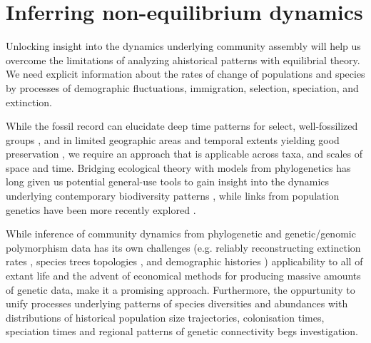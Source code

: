 \documentclass[12pt]{article}
\begin{document}
\section{Inferring non-equilibrium dynamics}

Unlocking insight into the dynamics underlying community assembly will
help us overcome the limitations of analyzing ahistorical patterns
with equilibrial theory. We need explicit information about the rates
of change of populations and species by processes of demographic
fluctuations, immigration, selection, speciation, and extinction.

While the fossil record can elucidate deep time patterns for select,
well-fossilized groups \citep{Alroy2008-no}, and in limited geographic
areas and temporal extents yielding good preservation
\citep{Harnik2011-qe}, we require an approach that is applicable
across taxa, and scales of space and time. Bridging ecological theory
with models from phylogenetics has long given us potential general-use
tools to gain insight into the dynamics underlying contemporary
biodiversity patterns \citep{Webb2002-yr, Emerson2002-mw,
  Lavergne2010-ts}, while links from population genetics have been
more recently explored \citep{Webb2002-yr, Emerson2002-mw,
  Lavergne2010-ts, Li2016-ns, McGaughran2015-sy, Laroche2015-qo,
  Vanoverbeke2015-ym, Vellend2005-qd,
  Papadopoulou2011-bd,Dexter2012-rn}.

While inference of community dynamics from phylogenetic and
genetic/genomic polymorphism data has its own challenges
(e.g. reliably reconstructing extinction rates \citep{Quental2009-jf},
species trees topologies \citep{Mallet2016-iu,Xu2016-ql}, and
demographic histories \citep{Terhorst2015-mt, Robinson2014-vy,
  Sousa2013-ox, Hickerson2014-za}) applicability to all of extant life
and the advent of economical methods for producing massive amounts of
genetic data, make it a promising approach.  Furthermore, the
oppurtunity to unify processes underlying patterns of species
diversities and abundances with distributions of historical population
size trajectories, colonisation times, speciation times and regional
patterns of genetic connectivity begs investigation.
\end{document}
